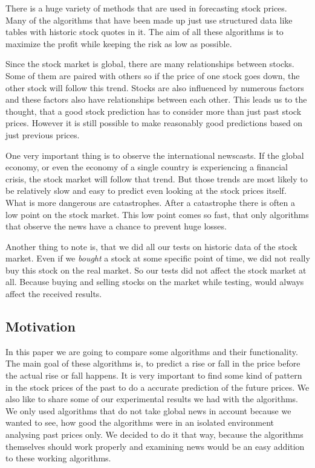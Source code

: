 \documentclass[conference]{IEEEtran}
\begin{document}
There is a huge variety of methods that are used in forecasting stock prices. Many of the algorithms that have been made up just use structured data like tables with historic stock quotes in it. The aim of all these algorithms is to maximize the profit while keeping the risk as low as possible.

Since the stock market is global, there are many relationships between stocks. Some of them are paired with others so if the price of one stock goes down, the other stock will follow this trend.
Stocks are also influenced by numerous factors and these factors also have relationships between each other. This leads us to the thought, that a good stock prediction has to consider more than just past stock prices. However it is still possible to make reasonably good predictions based on just previous prices.

One very important thing is to observe the international newscasts. If the global economy, or even the economy of a single country is experiencing a financial crisis, the stock market will follow that trend. But those trends are most likely to be relatively slow and easy to predict even looking at the stock prices itself. What is more dangerous are catastrophes. After a catastrophe there is often a low point on the stock market. This low point comes so fast, that only algorithms that observe the news have a chance to prevent huge losses.

Another thing to note is, that we did all our tests on historic data of the stock market. Even if we \textit{bought} a stock at some specific point of time, we did not really buy this stock on the real market. So our tests did not affect the stock market at all. Because buying and selling stocks on the market while testing, would always affect the received results.

\subsection{Motivation}

In this paper we are going to compare some algorithms and their functionality. The main goal of these algorithms is, to predict a rise or fall in the price before the actual rise or fall happens. It is very important to find some kind of pattern in the stock prices of the past to do a accurate prediction of the future prices. We also like to share some of our experimental results we had with the algorithms. We only used algorithms that do not take global news in account because we wanted to see, how good the algorithms were in an isolated environment analysing past prices only. We decided to do it that way, because the algorithms themselves should work properly and examining news would be an easy addition to these working algorithms.
\end{document}
